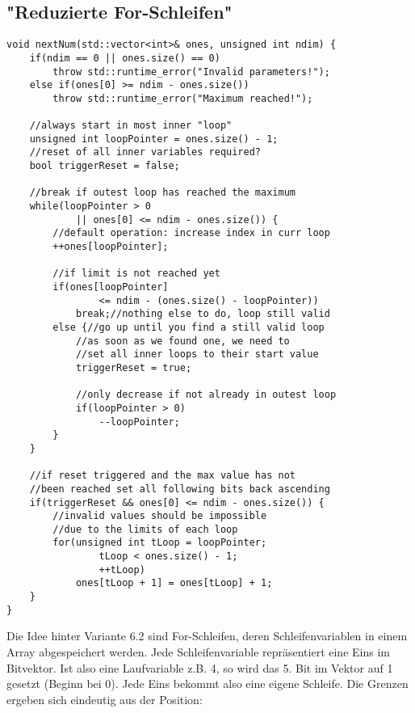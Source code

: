 \documentclass{article}
\begin{document}
\subsection{"Reduzierte For-Schleifen"}

\lstset{language=C++}

\begin{lstlisting}[frame=single]
void nextNum(std::vector<int>& ones, unsigned int ndim) {
    if(ndim == 0 || ones.size() == 0)
        throw std::runtime_error("Invalid parameters!");
    else if(ones[0] >= ndim - ones.size())
        throw std::runtime_error("Maximum reached!");

    //always start in most inner "loop"
    unsigned int loopPointer = ones.size() - 1;
    //reset of all inner variables required?
    bool triggerReset = false;

    //break if outest loop has reached the maximum
    while(loopPointer > 0
            || ones[0] <= ndim - ones.size()) {
        //default operation: increase index in curr loop
        ++ones[loopPointer];

        //if limit is not reached yet
        if(ones[loopPointer]
                <= ndim - (ones.size() - loopPointer))
            break;//nothing else to do, loop still valid
        else {//go up until you find a still valid loop
            //as soon as we found one, we need to
            //set all inner loops to their start value
            triggerReset = true;

            //only decrease if not already in outest loop
            if(loopPointer > 0)
                --loopPointer;
        }
    }

    //if reset triggered and the max value has not
    //been reached set all following bits back ascending
    if(triggerReset && ones[0] <= ndim - ones.size()) {
        //invalid values should be impossible
        //due to the limits of each loop
        for(unsigned int tLoop = loopPointer;
                tLoop < ones.size() - 1;
                ++tLoop)
            ones[tLoop + 1] = ones[tLoop] + 1;
    }
}
\end{lstlisting}

Die Idee hinter Variante 6.2 sind For-Schleifen, deren Schleifenvariablen in einem Array abgespeichert werden. Jede Schleifenvariable repräsentiert eine Eins im Bitvektor. Ist also eine Laufvariable z.B. 4, so wird das 5. Bit im Vektor auf 1 gesetzt (Beginn bei 0). Jede Eins bekommt also eine eigene Schleife. Die Grenzen ergeben sich eindeutig aus der Position:
\end{document}
